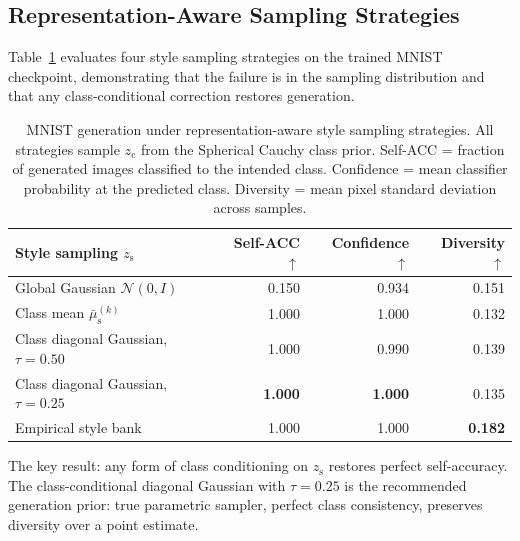 \documentclass[10pt]{article}
\newcommand{\zc}{z_{\mathrm{c}}}
\newcommand{\zs}{z_{\mathrm{s}}}
\newcommand{\mus}{\mu_{\mathrm{s}}}
\begin{document}
\subsection{Representation-Aware Sampling Strategies}
\label{sec:sampling}

Table~\ref{tab:sampling} evaluates four style sampling strategies on the
trained MNIST checkpoint, demonstrating that the failure is in the sampling
distribution and that any class-conditional correction restores generation.

\begin{table}[t]
\centering
\caption{MNIST generation under representation-aware style sampling strategies.
         All strategies sample $\zc$ from the Spherical Cauchy class prior.
         Self-ACC = fraction of generated images classified to the intended class.
         Confidence = mean classifier probability at the predicted class.
         Diversity = mean pixel standard deviation across samples.}
\label{tab:sampling}
\begin{tabular}{lrrr}
\toprule
Style sampling $\zs$ & Self-ACC $\uparrow$ & Confidence $\uparrow$ & Diversity $\uparrow$ \\
\midrule
Global Gaussian $\mathcal{N}(0,I)$           & 0.150 & 0.934 & 0.151 \\
Class mean $\bar\mus^{(k)}$                  & 1.000 & 1.000 & 0.132 \\
Class diagonal Gaussian, $\tau=0.50$         & 1.000 & 0.990 & 0.139 \\
Class diagonal Gaussian, $\tau=0.25$         & \textbf{1.000} & \textbf{1.000} & 0.135 \\
Empirical style bank                         & 1.000 & 1.000 & \textbf{0.182} \\
\bottomrule
\end{tabular}
\end{table}

The key result: any form of class conditioning on $\zs$ restores perfect self-accuracy.
The class-conditional diagonal Gaussian with $\tau=0.25$ is the recommended
generation prior: true parametric sampler, perfect class consistency, preserves
diversity over a point estimate.
\end{document}
